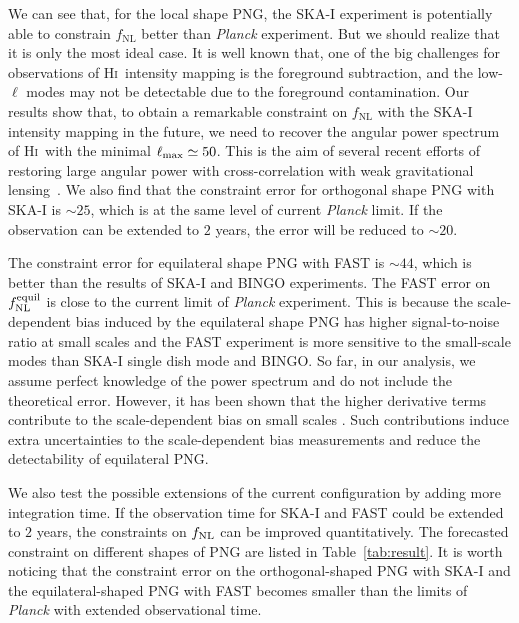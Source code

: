 \documentclass[twocolumn,floatfix,nofootinbib,aps,reprint]{revtex4}
\def\hi{\textsc{Hi~}}
\begin{document}
We can see that, for the local shape PNG, 
the SKA-I experiment is potentially able to constrain $f_\mathrm{NL}$ better 
than {\it Planck} experiment. But we should realize that it is only the most
ideal case. It is well known that, one of the big challenges 
for observations of \hi intensity mapping is the foreground subtraction, and the low-$\ell$
modes may not be detectable due to the foreground contamination.
Our results show that, to obtain a remarkable constraint on $f_\mathrm{NL}$ 
with the SKA-I intensity mapping in the future, we need to recover 
the angular power spectrum of \hi with the minimal $\ell_{\rm max}\simeq 50$. This is the aim of
several recent efforts of restoring large angular power with cross-correlation with weak gravitational lensing~\cite{Zhu16a,Zhu16b}. We also find that the constraint error for orthogonal shape 
PNG with SKA-I is $\sim25$, which is
at the same level of current {\it Planck} limit. If the observation 
can be extended to $2$ years, the error will be reduced to $\sim20$.

The constraint error for equilateral shape
PNG with FAST is $\sim44$, which 
is better than the results of SKA-I and BINGO experiments. 
The FAST error on $f^{\rm equil}_{\rm NL}$ 
is close to the current limit of {\it Planck} experiment. 
This is because the scale-dependent bias induced by the equilateral shape 
PNG has higher signal-to-noise ratio at small
scales and the FAST experiment is more sensitive to the small-scale
modes than SKA-I single dish mode and BINGO. 
So far, in our analysis, we assume perfect knowledge of the power spectrum
and do not include the theoretical error.
However, it has been shown that the higher derivative terms contribute 
to the scale-dependent bias on small scales
\cite{2016arXiv160200674B, 2015JCAP...12..043A}. 
Such contributions induce extra uncertainties to the scale-dependent bias
measurements and reduce the detectability of equilateral PNG.


We also test the possible extensions of the current configuration by adding more integration time.
If the observation time for SKA-I and FAST could be extended to $2$ years, the constraints on $f_{\rm NL}$
can be improved quantitatively. The forecasted constraint on different shapes of PNG are listed
in Table~\ref{tab:result}. It is worth noticing that the constraint
error on the orthogonal-shaped PNG with SKA-I and the equilateral-shaped PNG
with FAST becomes smaller than the limits of {\it Planck} with extended observational time.
\end{document}

